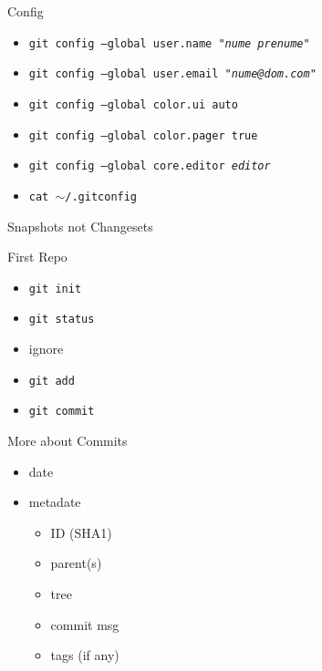 \documentclass{beamer}
\begin{document}
\begin{frame}{Config}
  \begin{itemize}
    \item \texttt{git config --global user.name "\textit{nume prenume}"}
    \item \texttt{git config --global user.email "\textit{nume@dom.com}"}
    \item \texttt{git config --global color.ui auto}
    \item \texttt{git config --global color.pager true}
    \item \texttt{git config --global core.editor \textit{editor}}
    \item \texttt{cat $\sim$/.gitconfig}
  \end{itemize}
\end{frame}

\begin{frame}{Snapshots not Changesets}
\end{frame}

\begin{frame}{First Repo}
  \begin{itemize}
    \item \texttt{git init}
    \item \texttt{git status}
    \item ignore %
    \item \texttt{git add}
    \item \texttt{git commit}
  \end{itemize}
\end{frame}

\begin{frame}{More about Commits}
  \begin{itemize}
    \item date
    \item metadate
    \begin{itemize}
      \item ID (SHA1)
      \item parent(s)
      \item tree
      \item commit msg
      \item tags (if any)
    \end{itemize}
  \end{itemize}
\end{frame}
\end{document}
